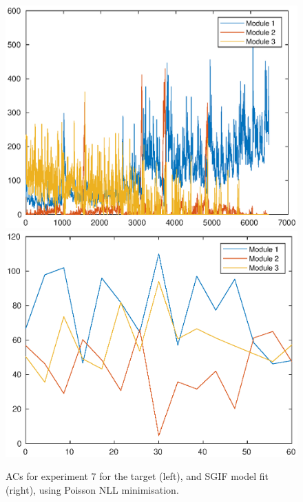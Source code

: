 \documentclass[mphil,deptreport,ianc]{infthesis} %
\begin{document}
\begin{figure}
    \centering
    \includegraphics[width=0.49\columnwidth]{figures/sleep/ACs147.eps}
    \includegraphics[width=0.49\columnwidth]{figures/sleep/ACs_nuovo_sleep_v2_spikes_mt_microGIF_euid_12-29_02-12-29-631_exp_6_lfn_poisson_nll.eps}
    \caption{ACs for experiment 7 for the target (left), and SGIF model fit (right), using Poisson NLL minimisation.}
    \label{fig:ACs_exp7}
\end{figure}
\end{document}
